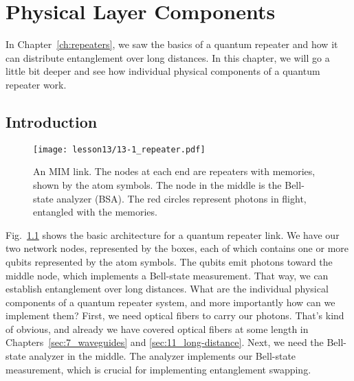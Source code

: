 
\chapter{Physical Layer Components}

In Chapter~\ref{ch:repeaters}, we saw the basics of a quantum repeater and how it can distribute entanglement over long distances. In this chapter, we will go a little bit deeper and see how individual physical components of a quantum repeater work.

\section{Introduction}

\begin{figure}[t]
    \centering
    \texttt{[image: lesson13/13-1\_repeater.pdf]}
    \caption[MIM link hardware]{An MIM link. The nodes at each end are repeaters with memories, shown by the atom symbols.  The node in the middle is the Bell-state analyzer (BSA).  The red circles represent photons in flight, entangled with the memories.}
    \label{fig:13-MIM-link}
\end{figure}


Fig.~\ref{fig:13-MIM-link} shows the basic architecture for a quantum repeater link.
We have our two network nodes, represented by the boxes, each of which contains one or more qubits represented by the atom symbols.
The qubits emit photons toward the middle node, which implements a Bell-state measurement.
That way, we can establish entanglement over long distances. What are the individual physical components of a quantum repeater system, and more importantly how can we implement them? First, we need optical fibers to carry our photons. That's kind of obvious, and already we have covered optical fibers at some length in Chapters~\ref{sec:7_waveguides} and \ref{sec:11_long-distance}. Next, we need the Bell-state analyzer in the middle. The analyzer implements our Bell-state measurement, which is crucial for implementing entanglement swapping.

